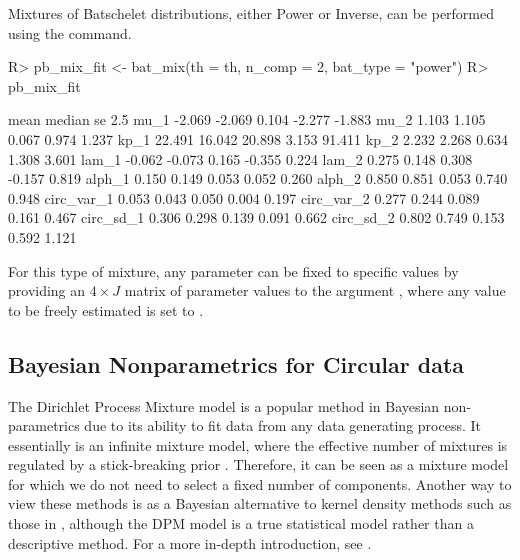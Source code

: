 Mixtures of Batschelet distributions, either Power or Inverse, can be
performed using the  command.

\begin{CodeChunk}

\begin{CodeInput}
R> pb_mix_fit <- bat_mix(th = th, n_comp = 2, bat_type = "power")
R> pb_mix_fit
\end{CodeInput}

\begin{CodeOutput}
             mean median     se   2.5%
mu_1       -2.069 -2.069  0.104 -2.277 -1.883
mu_2        1.103  1.105  0.067  0.974  1.237
kp_1       22.491 16.042 20.898  3.153 91.411
kp_2        2.232  2.268  0.634  1.308  3.601
lam_1      -0.062 -0.073  0.165 -0.355  0.224
lam_2       0.275  0.148  0.308 -0.157  0.819
alph_1      0.150  0.149  0.053  0.052  0.260
alph_2      0.850  0.851  0.053  0.740  0.948
circ_var_1  0.053  0.043  0.050  0.004  0.197
circ_var_2  0.277  0.244  0.089  0.161  0.467
circ_sd_1   0.306  0.298  0.139  0.091  0.662
circ_sd_2   0.802  0.749  0.153  0.592  1.121
\end{CodeOutput}
\end{CodeChunk}

For this type of mixture, any parameter can be fixed to specific values
by providing an \(4 \times J\) matrix of parameter values to the
argument , where any value to be freely estimated is
set to .

\hypertarget{bayesian-nonparametrics-for-circular-data}{%
\subsection{Bayesian Nonparametrics for Circular
data}\label{bayesian-nonparametrics-for-circular-data}}

\label{sec:dpmjss}

The Dirichlet Process Mixture model is a popular method in Bayesian
non-parametrics due to its ability to fit data from any data generating
process. It essentially is an infinite mixture model, where the
effective number of mixtures is regulated by a stick-breaking prior
\citep{ishwaran2001gibbs}. Therefore, it can be seen as a mixture model
for which we do not need to select a fixed number of components. Another
way to view these methods is as a Bayesian alternative to kernel density
methods such as those in  \citep{JSSv061i09}, although the
DPM model is a true statistical model rather than a descriptive method.
For a more in-depth introduction, see
\citet[ch. 23]{gelman2003bayesian}.

